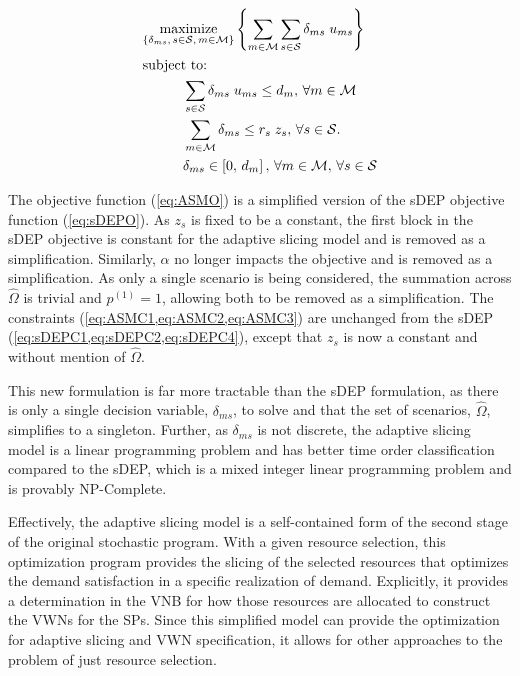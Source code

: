 \documentclass[12pt,dvipsnames]{report}
\begin{document}
\begin{tcolorbox}[floatplacement = !ht, float, title = Adaptive Slicing Model]
\begin{align}
& \underset{\left\{ \substack{
	\delta_{ms},\,	s \in \mathcal{S},\, m \in \mathcal{M}} \right\}} {\text{maximize}}
\left\{ \sum_{m \in \mathcal{M}} \sum_{s \in \mathcal{S}} \delta_{ms} \; u_{ms} \right\} \label{eq:ASMO}\\
& \text{subject to:}  \nonumber \\
& \hspace{0.4in} \sum_{s \in \mathcal{S}} \delta_{ms} \; u_{ms} \leq d_m,\, \forall m \in \mathcal{M} \label{eq:ASMC1}\\
& \hspace{0.4in} \sum_{m \in \mathcal{M}} \delta_{ms} \leq r_s \; z_s,\, \forall s \in \mathcal{S}. \label{eq:ASMC2}\\
& \hspace{0.4in} \delta_{ms} \in \left[ 0,\, d_m \right],\, \forall m \in \mathcal{M},\, \forall s \in \mathcal{S} \label{eq:ASMC3}
\end{align}
\end{tcolorbox}

The objective function (\cref{eq:ASMO}) is a simplified version of the sDEP objective function (\cref{eq:sDEPO}).  As $z_s$ is fixed to be a constant, the first block in the sDEP objective is constant for the adaptive slicing model and is removed as a simplification.  Similarly, $\alpha$ no longer impacts the objective and is removed as a simplification.  As only a single scenario is being considered, the summation across $\hat{\Omega}$ is trivial and $p^{(1)} = 1$, allowing both to be removed as a simplification.  The constraints (\cref{eq:ASMC1,eq:ASMC2,eq:ASMC3}) are unchanged from the sDEP (\cref{eq:sDEPC1,eq:sDEPC2,eq:sDEPC4}), except that $z_s$ is now a constant and without mention of $\hat{\Omega}$.

This new formulation is far more tractable than the sDEP formulation, as there is only a single decision variable, $\delta_{ms}$, to solve and that the set of scenarios, $\hat{\Omega}$, simplifies to a singleton.  Further, as $\delta_{ms}$ is not discrete, the adaptive slicing model is a linear programming problem and has better time order classification compared to the sDEP, which is a mixed integer linear programming problem and is provably NP-Complete.

Effectively, the adaptive slicing model is a self-contained form of the second stage of the original stochastic program.  With a given resource selection, this optimization program provides the slicing of the selected resources that optimizes the demand satisfaction in a specific realization of demand.  Explicitly, it provides a determination in the VNB for how those resources are allocated to construct the VWNs for the SPs.  Since this simplified model can provide the optimization for adaptive slicing and VWN specification, it allows for other approaches to the problem of just resource selection.
\end{document}
